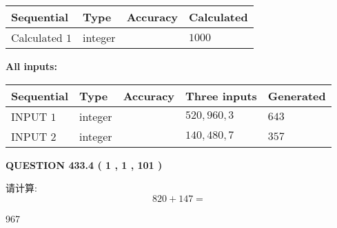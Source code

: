 \documentclass{ctexart}
\begin{document}
   
   
   
\noindent{}
   
   
  
  
\noindent\begin{tabular}{|l|l|l|l|}
\hline
 Sequential & Type & Accuracy & Calculated \\ 
\hline
 
 
  Calculated $  1 $ & integer &  & 
  $ 1000 $ 
 \\  \hline  
 \end{tabular}
   
   
   
   
\noindent\vspace{0.1in}\hspace{-0.08in} {\textbf{\Large{All inputs: }}}
   
   
  
  
\noindent\begin{tabular}{|l|l|l|l|l|}
\hline
 Sequential & Type & Accuracy & Three inputs & Generated \\ 
\hline
 
 
  INPUT $  1 $ & integer &  & $
 520
 , 
 960
 , 
 3
 $ & $ 643 $ 
 \\  \hline  
 
 
  INPUT $  2 $ & integer &  & $
 140
 , 
 480
 , 
 7
 $ & $ 357 $ 
 \\  \hline  
 \end{tabular}
   
   
  
\vspace{0.2in}
  
{\textbf{\Large{QUESTION
433.4 
 ( 1 , 1 , 101 )
}}}
  
  
 
请计算:
\begin{equation}
820 +  %
147 = \nonumber
\end{equation}
 
 
 
\noindent{}
 
 

967
 
 
\noindent{}
 
 

 
 
 
\noindent{}
 
\end{document}
